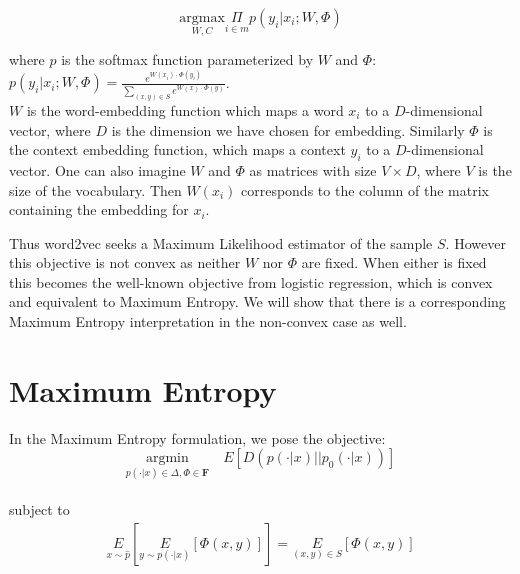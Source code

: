 \documentclass[]{article}
\begin{document}
\begin{equation} \underset{W,C}{\text{argmax}} \underset{i \in m}{\Pi}{p(y_i|x_i; W, \Phi)}\label{eq:gibbs}\end{equation} 

\noindent where $p$ is the softmax function parameterized by $W$ and $\Phi$:\\

$p(y_i|x_i; W,\Phi) = \frac{e^{W(x_i) \cdot \Phi(y_i)}}{\sum_{(x,y) \in S}e^{W(x) \cdot \Phi(y)}}$.\\

$W$ is the word-embedding function which maps a word $x_i$ to a $D$-dimensional vector, where $D$ is the dimension we have chosen for embedding. Similarly $\Phi$ is the context embedding function, which maps a context $y_i$ to a $D$-dimensional vector. One can also imagine $W$ and $\Phi$ as matrices with size $V \times D$, where $V$ is the size of the vocabulary. Then $W(x_i)$ corresponds to the column of the matrix containing the embedding for $x_i$.

Thus word2vec seeks a Maximum Likelihood estimator of the sample $S$. However this objective is not convex as neither $W$ nor $\Phi$ are fixed. When either is fixed this becomes the well-known objective from logistic regression, which is convex and equivalent to Maximum Entropy\cite{dummy}. We will show that there is a corresponding Maximum Entropy interpretation in the non-convex case as well.

\section{Maximum Entropy}

In the Maximum Entropy formulation, we pose the objective:\\

\begin{equation}\underset{p(\cdot | x) \in \Delta, \Phi \in \mathbf{F}}{\text{argmin}} \quad E \left[D(p(\cdot|x) \vert \vert  p_0(\cdot|x))\right]\label{eq:maxent}
\end{equation}
\\

\noindent subject to\\

\begin{align}\underset{x \sim \hat{p}}{E}\left[\underset{y \sim p(\cdot|x)}{E}\left[\Phi(x,y)\right]\right] = \underset{(x,y) \in S}{E}\left[\Phi(x,y)\right]
\end{align}
\end{document}
